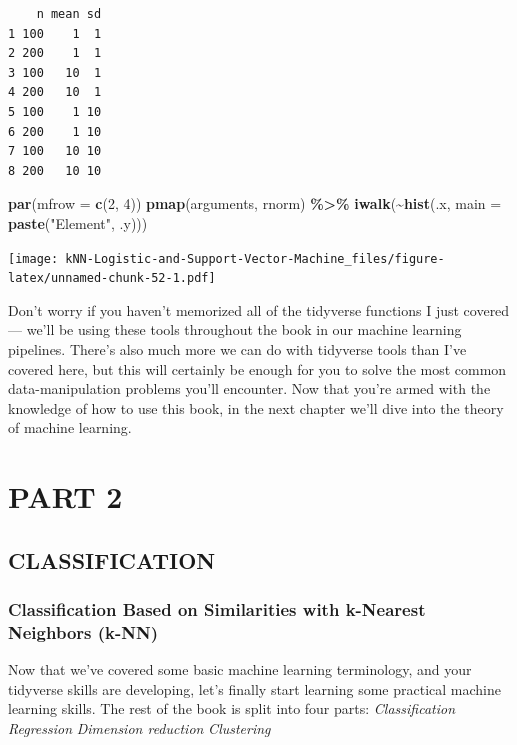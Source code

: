 \documentclass[
]{article}
\newenvironment{Shaded}{\begin{snugshade}}{\end{snugshade}}
\newcommand{\AttributeTok}[1]{\textcolor[rgb]{0.13,0.29,0.53}{#1}}
\newcommand{\DecValTok}[1]{\textcolor[rgb]{0.00,0.00,0.81}{#1}}
\newcommand{\FunctionTok}[1]{\textcolor[rgb]{0.13,0.29,0.53}{\textbf{#1}}}
\newcommand{\NormalTok}[1]{#1}
\newcommand{\SpecialCharTok}[1]{\textcolor[rgb]{0.81,0.36,0.00}{\textbf{#1}}}
\newcommand{\StringTok}[1]{\textcolor[rgb]{0.31,0.60,0.02}{#1}}
\begin{document}
\begin{verbatim}
    n mean sd
1 100    1  1
2 200    1  1
3 100   10  1
4 200   10  1
5 100    1 10
6 200    1 10
7 100   10 10
8 200   10 10
\end{verbatim}

\begin{Shaded}
\begin{Highlighting}[]
\FunctionTok{par}\NormalTok{(}\AttributeTok{mfrow =} \FunctionTok{c}\NormalTok{(}\DecValTok{2}\NormalTok{, }\DecValTok{4}\NormalTok{))}
\FunctionTok{pmap}\NormalTok{(arguments, rnorm) }\SpecialCharTok{\%\textgreater{}\%}
  \FunctionTok{iwalk}\NormalTok{(}\SpecialCharTok{\textasciitilde{}}\FunctionTok{hist}\NormalTok{(.x, }\AttributeTok{main =} \FunctionTok{paste}\NormalTok{(}\StringTok{"Element"}\NormalTok{, .y)))}
\end{Highlighting}
\end{Shaded}

\texttt{[image: kNN-Logistic-and-Support-Vector-Machine\_files/figure-latex/unnamed-chunk-52-1.pdf]}

Don't worry if you haven't memorized all of the tidyverse functions I
just covered--- we'll be using these tools throughout the book in our
machine learning pipelines. There's also much more we can do with
tidyverse tools than I've covered here, but this will certainly be
enough for you to solve the most common data-manipulation problems
you'll encounter. Now that you're armed with the knowledge of how to use
this book, in the next chapter we'll dive into the theory of machine
learning.

\section{PART 2}\label{part-2}

\subsection{CLASSIFICATION}\label{classification}

\subsubsection{Classification Based on Similarities with k-Nearest
Neighbors
(k-NN)}\label{classification-based-on-similarities-with-k-nearest-neighbors-k-nn}

Now that we've covered some basic machine learning terminology, and your
tidyverse skills are developing, let's finally start learning some
practical machine learning skills. The rest of the book is split into
four parts: \emph{Classification} \emph{Regression} \emph{Dimension
reduction} \emph{Clustering}
\end{document}
